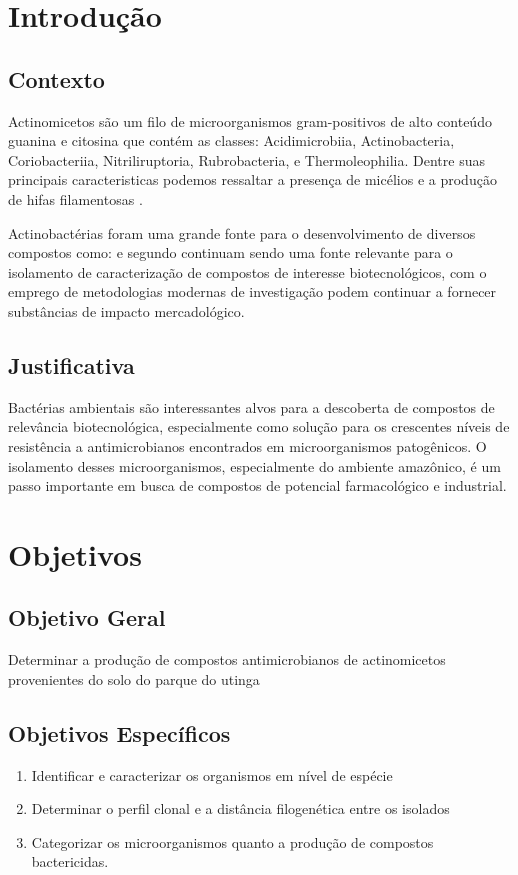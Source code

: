 \chapter{Introdução}
\label{cap:introducao}

\section{Contexto}
Actinomicetos são um filo de microorganismos gram-positivos de alto conteúdo
guanina e citosina que contém as classes: Acidimicrobiia, Actinobacteria, 
Coriobacteriia, Nitriliruptoria, Rubrobacteria, e Thermoleophilia\cite{yadav2018}.
Dentre suas principais caracteristicas podemos ressaltar a presença de micélios
e a produção de hifas filamentosas \cite{chater2016}.

Actinobactérias foram uma grande fonte para o desenvolvimento de diversos
compostos como:%
 e segundo  continuam sendo uma fonte relevante
para o isolamento de caracterização de compostos de interesse biotecnológicos, com o
emprego de metodologias modernas de investigação podem continuar a fornecer 
substâncias de impacto mercadológico.

\section{Justificativa}
Bactérias ambientais são interessantes alvos para a descoberta de compostos
de relevância biotecnológica, especialmente como solução para os crescentes níveis
de resistência a antimicrobianos encontrados em microorganismos patogênicos.
O isolamento desses microorganismos, especialmente do ambiente amazônico,
é um passo importante em busca de compostos de potencial farmacológico e industrial.

\chapter{Objetivos}

\section{Objetivo Geral}

Determinar a produção de compostos antimicrobianos de actinomicetos
provenientes do solo do parque do utinga

\section{Objetivos Específicos}
\begin{enumerate}
    \item Identificar e caracterizar os organismos em nível de espécie
    \item Determinar o perfil clonal e a distância filogenética entre os isolados
    \item Categorizar os microorganismos quanto a produção de compostos bactericidas.
\end{enumerate}





